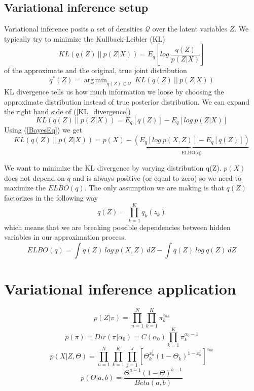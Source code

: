 \documentclass{article}
\newcommand\ProbSingleCoin{\Theta_k^{x_n^j}(1-\Theta_k)^{1-x_n^j}}
\newcommand\ProdK{\prod_{k=1}^{K}}
\newcommand\ProdN{\prod_{n=1}^{N}}
\newcommand\ProdJ{\prod_{j=1}^{J}}
\newcommand\Qfactor{\ProdK{q_k(z_k)}}
\DeclareMathOperator*{\argminA}{arg\,min}
\begin{document}
\subsection{Variational inference setup}
Variational inference posits a set of densities $\mathcal{Q}$  over the latent variables $Z$. We typically try to minimize the Kullback-Leibler (KL) 
\begin{equation}\label{KL_divergence}
    KL(q(Z)\: ||\: p(Z|X)) = E_{q}\left[log\:\frac{q(Z)}{p(Z|X)}\right]
\end{equation}
of the approximate and the original, true joint distribution
\begin{equation}
    q^*(Z) = \argminA_{q(Z)\in\mathcal{Q}}\: KL(q(Z)\: ||\: p(Z|X))
\end{equation}
KL divergence tells us how much information we loose by choosing the approximate distribution instead of true posterior distribution. 
We can expand the right hand side of (\ref{KL_divergence})
\begin{equation}
KL(q(Z)\: ||\: p(Z|X)) = E_q[q(Z)] - E_q[log\:p(Z|X)]
\end{equation}
Using (\ref{BayesEq}) we get
\begin{equation}
KL(q(Z)\: ||\: p(Z|X)) = p(X) - \underbrace{(E_q[log\:p(X,Z)] - E_q[q(Z)])}_\text{ELBO(q)}
\end{equation}

We want to minimize the KL divergence by varying distribution q(Z). $p(X)$ does not depend on $q$ and is always positive (or equal to zero) so we need to maximize the $ELBO(q)$. The only assumption we are making is that $q(Z)$ factorizes in the following way 
\begin{equation}
q(Z)=\Qfactor{}
\end{equation}
which means that we are breaking possible dependencies between hidden variables in our approximation process.
\begin{equation}
    ELBO(q) = \int q(Z)\: log\:{p(X,Z)}\:dZ - \int q(Z)\:log{\:q(Z)}\:dZ
\end{equation}

\section{Variational inference application}
\begin{equation}
    p(Z|\pi) = \ProdN \ProdK \pi_k^{z_{nk}}
\end{equation}
\begin{equation}
    p(\pi) = Dir(\pi|\alpha_0) = C(\alpha_0)\ProdK{}\pi_k^{\alpha_0-1}
\end{equation}
\begin{equation}
    p(X|Z,\Theta)= \ProdN\ProdK\ProdJ[\ProbSingleCoin{}]^{z_{nk}}
\end{equation}
\begin{equation}
    p(\Theta|a,b) = \frac{\Theta^{a-1}(1-\Theta)^{b-1}}{Beta(a,b)}
\end{equation}
\end{document}
